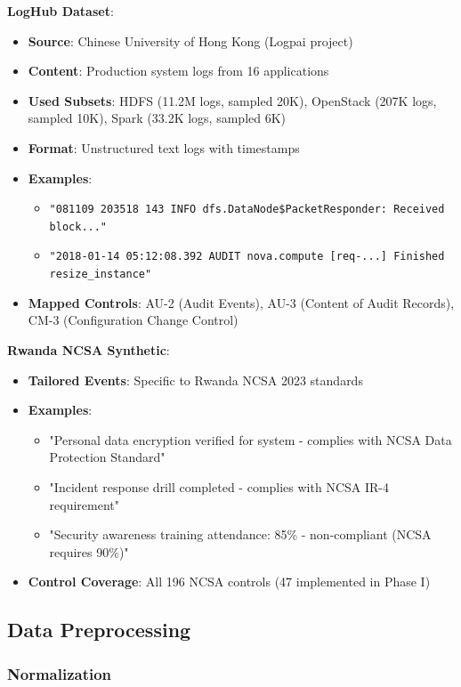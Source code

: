 \documentclass[11pt,conference]{IEEEtran}
\begin{document}
\textbf{LogHub Dataset}:
\begin{itemize}
    \item \textbf{Source}: Chinese University of Hong Kong (Logpai project)
    \item \textbf{Content}: Production system logs from 16 applications
    \item \textbf{Used Subsets}: HDFS (11.2M logs, sampled 20K), OpenStack (207K logs, sampled 10K), Spark (33.2K logs, sampled 6K)
    \item \textbf{Format}: Unstructured text logs with timestamps
    \item \textbf{Examples}:
    \begin{itemize}
        \item \texttt{"081109 203518 143 INFO dfs.DataNode\$PacketResponder: Received block..."}
        \item \texttt{"2018-01-14 05:12:08.392 AUDIT nova.compute [req-...] Finished resize\_instance"}
    \end{itemize}
    \item \textbf{Mapped Controls}: AU-2 (Audit Events), AU-3 (Content of Audit Records), CM-3 (Configuration Change Control)
\end{itemize}

\textbf{Rwanda NCSA Synthetic}:
\begin{itemize}
    \item \textbf{Tailored Events}: Specific to Rwanda NCSA 2023 standards
    \item \textbf{Examples}:
    \begin{itemize}
        \item "Personal data encryption verified for {system} - complies with NCSA Data Protection Standard"
        \item "Incident response drill completed - complies with NCSA IR-4 requirement"
        \item "Security awareness training attendance: 85\% - non-compliant (NCSA requires 90\%)"
    \end{itemize}
    \item \textbf{Control Coverage}: All 196 NCSA controls (47 implemented in Phase I)
\end{itemize}

\subsection{Data Preprocessing}

\subsubsection{Normalization}
\end{document}
